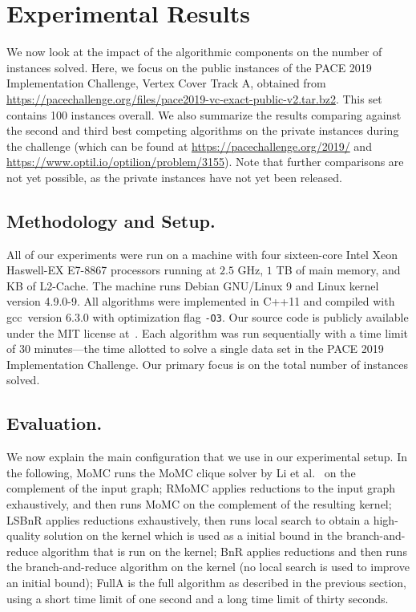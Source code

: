 \documentclass[twoside,leqno,twocolumn]{article}
\newcommand{\AlgName}[1]{\textsf{#1}}
\begin{document}
\section{Experimental Results}
\label{sec:experiments}
We now look at the impact of the algorithmic components on the number of instances solved.
Here, we focus on the public instances  of the PACE 2019 Implementation Challenge, Vertex Cover Track A, obtained from \url{https://pacechallenge.org/files/pace2019-vc-exact-public-v2.tar.bz2}. This set contains 100 instances overall. We also summarize the results comparing against the second and third best competing algorithms on the private instances during the challenge (which can be found at \url{https://pacechallenge.org/2019/} and \url{https://www.optil.io/optilion/problem/3155}). Note that further comparisons are not yet possible, as the private instances have not yet been released. 

\subsection{Methodology and Setup.}
All of our experiments were run on a machine with  four sixteen-core Intel Xeon Haswell-EX E7-8867 processors running at $2.5$ GHz, $1$ TB of main memory, and  KB of L2-Cache.
The machine runs Debian GNU/Linux 9 and Linux kernel version 4.9.0-9.
All algorithms were implemented in C++11 and compiled with gcc~version 6.3.0 with optimization flag \texttt{-O3}. Our source code is publicly available under the MIT license at~\cite{wegotyoucovered2019}.
Each algorithm was run sequentially with a time limit of 30 minutes---the time allotted to solve a single data set in the PACE 2019 Implementation Challenge. Our primary focus is on the total number of instances solved.
\subsection{Evaluation.}
We now explain the main configuration that we use in our experimental setup.
In the following, \AlgName{MoMC} runs the MoMC clique solver by Li et
al.~\cite{DBLP:journals/cor/LiJM17} on the complement of the input graph;
\AlgName{RMoMC} applies reductions to the input graph exhaustively, and then
runs MoMC on the complement of the resulting kernel; \AlgName{LSBnR} applies
reductions exhaustively, then runs local search to obtain a high-quality
solution on the kernel which is used as a initial bound in the branch-and-reduce
algorithm that is run on the kernel; \AlgName{BnR} applies reductions and then
runs the branch-and-reduce algorithm on the kernel (no local search is used to
improve an initial bound); \AlgName{FullA} is the full algorithm as described in
the previous section, using a short time limit of one second and a long time limit of thirty seconds.
\end{document}
